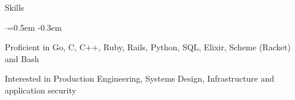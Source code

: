 \documentclass{resume} %
\begin{document}

\begin{rSection}{Skills}
  \vspace {0.3em}
  \begin{list}{$\cdot$}{\leftmargin=0.5em}
    \itemsep -0.3em \vspace{-0.3em}
    \item Proficient in Go, C, C++, Ruby, Rails, Python, SQL, Elixir, Scheme (Racket) and Bash
    \item Interested in Production Engineering, Systems Design, Infrastructure
      and application security 
  \end{list}
  \vspace{0.3em}
\end{rSection}


\end{document}
